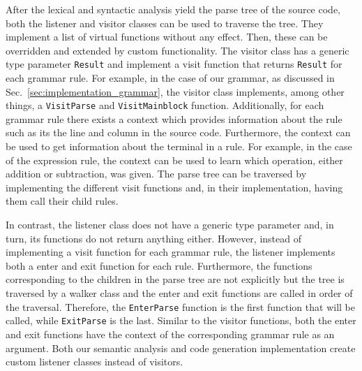 After the lexical and syntactic analysis yield the parse tree of the source code, both the listener and visitor classes can be used to traverse the tree. They implement a list of virtual functions without any effect. Then, these can be overridden and extended by custom functionality. The visitor class has a generic type parameter \texttt{Result} and implement a visit function that returns \texttt{Result} for each grammar rule. For example, in the case of our grammar, as discussed in Sec.~\ref{sec:implementation_grammar}, the visitor class implements, among other things, a \texttt{VisitParse} and \texttt{VisitMainblock} function. Additionally, for each grammar rule there exists a context which provides information about the rule such as its the line and column in the source code. Furthermore, the context can be used to get information about the terminal in a rule. For example, in the case of the expression rule, the context can be used to learn which operation, either addition or subtraction, was given. The parse tree can be traversed by implementing the different visit functions and, in their implementation, having them call their child rules.

In contrast, the listener class does not have a generic type parameter and, in turn, its functions do not return anything either. However, instead of implementing a visit function for each grammar rule, the listener implements both a enter and exit function for each rule. Furthermore, the functions corresponding to the children in the parse tree are not explicitly but the tree is traversed by a walker class and the enter and exit functions are called in order of the traversal. Therefore, the \texttt{EnterParse} function is the first function that will be called, while \texttt{ExitParse} is the last. Similar to the visitor functions, both the enter and exit functions have the context of the corresponding grammar rule as an argument. Both our semantic analysis and code generation implementation create custom listener classes instead of visitors.
